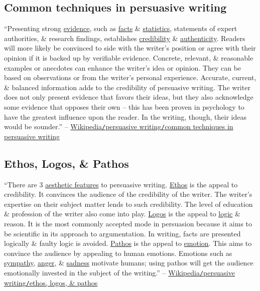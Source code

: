 \documentclass[oneside]{book}
\numberwithin{equation}{section}
\begin{document}
\subsection{Common techniques in persuasive writing}
``Presenting strong \href{https://en.wikipedia.org/wiki/Evidence}{evidence}, such as \href{https://en.wikipedia.org/wiki/Fact}{facts} \& \href{https://en.wikipedia.org/wiki/Statistics}{statistics}, statements of expert authorities, \& research findings, establishes \href{https://en.wikipedia.org/wiki/Credibility}{credibility} \& \href{https://en.wikipedia.org/wiki/Authenticity_(philosophy)}{authenticity}. Readers will more likely be convinced to side with the writer's position or agree with their opinion if it is backed up by verifiable evidence. Concrete, relevant, \& reasonable examples or anecdotes can enhance the writer's idea or opinion. They can be based on observations or from the writer's personal experience. Accurate, current, \& balanced information adds to the credibility of persuasive writing. The writer does not only present evidence that favors their ideas, but they also acknowledge some evidence that opposes their own -- this has been proven in psychology to have the greatest influence upon the reader. In the writing, though, their ideas would be sounder.'' -- \href{https://en.wikipedia.org/wiki/Persuasive_writing#Common_techniques_in_persuasive_writing}{Wikipedia\texttt{/}persuasive writing\texttt{/}common techniques in persuasive writing}

\subsection{Ethos, Logos, \& Pathos}
``There are 3 \href{https://en.wikipedia.org/wiki/Aesthetics}{aesthetic features} to persuasive writing. \href{https://en.wikipedia.org/wiki/Ethos}{Ethos} is the appeal to credibility. It convinces the audience of the credibility of the writer. The writer's expertise on their subject matter lends to such credibility. The level of education \& profession of the writer also come into play. \href{https://en.wikipedia.org/wiki/Logos}{Logos} is the appeal to \href{https://en.wikipedia.org/wiki/Logic}{logic} \& reason. It is the most commonly accepted mode in persuasion because it aims to be scientific in its approach to argumentation. In writing, facts are presented logically \& faulty logic is avoided. \href{https://en.wikipedia.org/wiki/Pathos}{Pathos} is the appeal to \href{https://en.wikipedia.org/wiki/Emotion}{emotion}. This aims to convince the audience by appealing to human emotions. Emotions such as \href{https://en.wikipedia.org/wiki/Sympathy}{sympathy}, \href{https://en.wikipedia.org/wiki/Anger}{anger}, \& \href{https://en.wikipedia.org/wiki/Sadness}{sadness} motivate humans; using pathos will get the audience emotionally invested in the subject of the writing.'' -- \href{https://en.wikipedia.org/wiki/Persuasive_writing#Ethos,_Logos,_and_Pathos}{Wikipedia\texttt{/}persuasive writing\texttt{/}ethos, logos, \& pathos}
\end{document}
